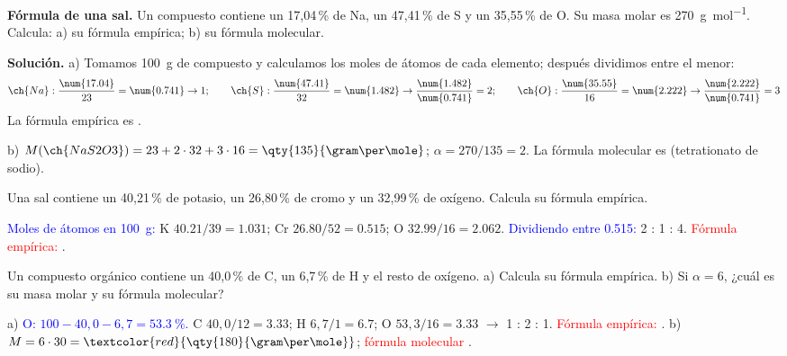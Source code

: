 \begin{example}
    \textbf{Fórmula de una sal.} Un compuesto contiene un 17,04\,\% de Na, un 47,41\,\% de S y un 35,55\,\% de O. Su masa molar es
    \qty{270}{\gram\per\mole}. Calcula: a) su fórmula empírica; b) su fórmula molecular.

    \textbf{Solución.} a) Tomamos \qty{100}{\gram} de compuesto y calculamos los moles de átomos de cada elemento; después
    dividimos entre el menor:
    \[ \ch{Na}: \frac{\num{17.04}}{23} = \num{0.741} \rightarrow 1; \qquad
       \ch{S}: \frac{\num{47.41}}{32} = \num{1.482} \rightarrow \frac{\num{1.482}}{\num{0.741}} = 2; \qquad
       \ch{O}: \frac{\num{35.55}}{16} = \num{2.222} \rightarrow \frac{\num{2.222}}{\num{0.741}} = 3 \]
    La fórmula empírica es .

    b) \(M(\ch{NaS2O3}) = 23 + 2 \cdot 32 + 3 \cdot 16 = \qty{135}{\gram\per\mole}\); \(\alpha = 270/135 = 2\). La fórmula
    molecular es  (tetrationato de sodio).
\end{example}

\begin{exercise}
    Una sal contiene un 40,21\,\% de potasio, un 26,80\,\% de cromo y un 32,99\,\% de oxígeno. Calcula su fórmula empírica.
    \begin{solu}
        \textcolor{blue}{Moles de átomos en \qty{100}{\gram}:} K \(\num{40.21}/39 = \num{1.031}\); Cr \(\num{26.80}/52 = \num{0.515}\);
        O \(\num{32.99}/16 = \num{2.062}\). \textcolor{blue}{Dividiendo entre \num{0.515}:} 2 : 1 : 4.
        \textcolor{red}{Fórmula empírica: }.
    \end{solu}
\end{exercise}

\begin{exercise}
    Un compuesto orgánico contiene un 40,0\,\% de C, un 6,7\,\% de H y el resto de oxígeno. a) Calcula su fórmula empírica.
    b) Si \(\alpha = 6\), ¿cuál es su masa molar y su fórmula molecular?
    \begin{solu}
        a) \textcolor{blue}{O: \(100 - 40{,}0 - 6{,}7 = \qty{53.3}{\percent}\).} C \(40{,}0/12 = \num{3.33}\); H \(6{,}7/1 = \num{6.7}\);
        O \(53{,}3/16 = \num{3.33}\) \(\rightarrow\) 1 : 2 : 1. \textcolor{red}{Fórmula empírica: }.
        b) \(M = 6 \cdot 30 = \textcolor{red}{\qty{180}{\gram\per\mole}}\); \textcolor{red}{fórmula molecular }.
    \end{solu}
\end{exercise}

